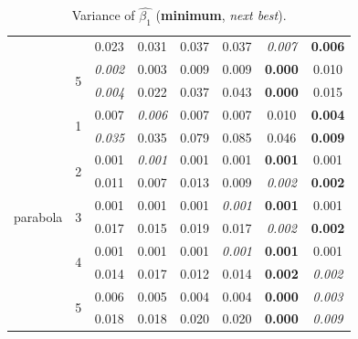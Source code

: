 \documentclass[authoryear, review, 11pt]{elsarticle}
\begin{document}
\begin{table}
\begin{center}
\begin{tabular}{cccccccc}
   &  & 0.023 & 0.031 & 0.037 & 0.037 & \emph{0.007} & \textbf{0.006} \\ 
   \cline{3-8}
   & \multirow{2}{*}{5} & \emph{0.002} & 0.003 & 0.009 & 0.009 & \textbf{0.000} & 0.010 \\ 
   &  & \emph{0.004} & 0.022 & 0.037 & 0.043 & \textbf{0.000} & 0.015 \\ 
   \hline
   \multirow{10}{*}{parabola} & \multirow{2}{*}{1} & 0.007 & \emph{0.006} & 0.007 & 0.007 & 0.010 & \textbf{0.004} \\ 
   &  & \emph{0.035} & 0.035 & 0.079 & 0.085 & 0.046 & \textbf{0.009} \\ 
   \cline{3-8}
   & \multirow{2}{*}{2} & 0.001 & \emph{0.001} & 0.001 & 0.001 & \textbf{0.001} & 0.001 \\ 
   &  & 0.011 & 0.007 & 0.013 & 0.009 & \emph{0.002} & \textbf{0.002} \\ 
   \cline{3-8}
   & \multirow{2}{*}{3} & 0.001 & 0.001 & 0.001 & \emph{0.001} & \textbf{0.001} & 0.001 \\ 
   &  & 0.017 & 0.015 & 0.019 & 0.017 & \emph{0.002} & \textbf{0.002} \\ 
   \cline{3-8}
   & \multirow{2}{*}{4} & 0.001 & 0.001 & 0.001 & \emph{0.001} & \textbf{0.001} & 0.001 \\ 
   &  & 0.014 & 0.017 & 0.012 & 0.014 & \textbf{0.002} & \emph{0.002} \\ 
   \cline{3-8}
   & \multirow{2}{*}{5} & 0.006 & 0.005 & 0.004 & 0.004 & \textbf{0.000} & \emph{0.003} \\ 
   &  & 0.018 & 0.018 & 0.020 & 0.020 & \textbf{0.000} & \emph{0.009} \\ 
  \end{tabular}
\caption{Variance of $\hat{\beta_1}$ (\textbf{minimum}, \emph{next best}).\label{VarX}} 
\end{center}
\end{table}
\end{document}
